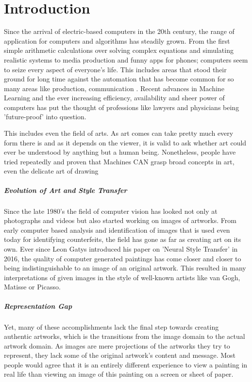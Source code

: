 \setchapterpreamble[u]{\margintoc}
\chapter{Introduction}

Since the arrival of electric-based computers in the 20th century, the range of 
application for computers and algorithms has steadily grown.
From the first simple arithmetic calculations over solving complex equations and simulating
realistic systems to media production and funny apps for phones; computers seem to
seize every aspect of everyone's life.
This includes areas that stood their ground for long time against the automation
that has become common for so many areas like production, communication \etc.
Recent advances in Machine Learning and the ever increasing efficiency, availability
and sheer power of computers has put the thought of professions like lawyers and physicians being
'future-proof' into question.

This includes even the field of arts.
As art comes can take pretty much every form there is and as it depends on the viewer,
it is valid to ask whether art could ever be understood by anything but a human being.
Nonetheless, people have tried repeatedly and proven that Machines CAN grasp broad
concepts in art, even the delicate art of drawing

\paragraph{Evolution of Art and Style Transfer}
Since the late 1980's the field of computer vision has looked not only at photographs
and videos but also started working on images of artworks.
From early computer based analysis and identification of images that is used even
today for identifying counterfeits, the field has gone as far as creating art on
its own.
Ever since Leon Gatys introduced his paper on 'Neural Style Transfer' in 2016, the quality
of computer generated paintings has come closer and closer to being indistinguishable to
an image of an original artwork.
This resulted in many interpretations of given images in the style of well-known
artists like van Gogh, Matisse or Picasso.

\paragraph{Representation Gap}
Yet, many of these accomplishments lack the final step towards creating authentic artworks,
which is the transitions from the image domain to the actual artwork domain.
As images are mere projections of the artworks they try to represent, they lack 
some of the original artwork's content and message.
Most people would agree that it is an entirely different experience to view a painting
in real life than viewing an image of this painting on a screen or sheet of paper.

